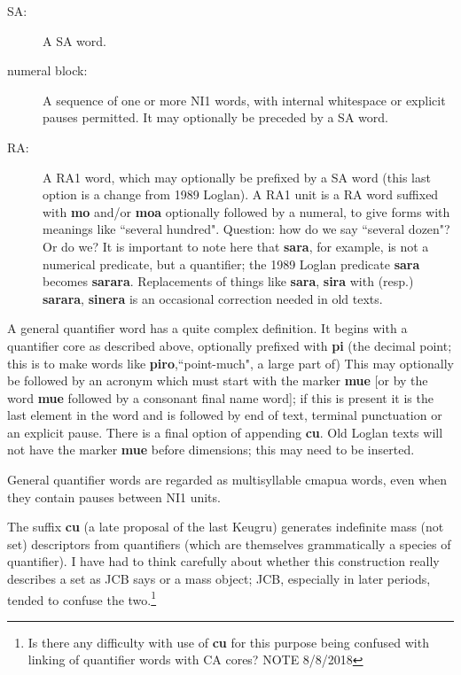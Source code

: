 \documentclass[12pt]{book}
\begin{document}
\begin{description}

\item[SA:]  A SA word.

\item[numeral block:]  A sequence of one or more NI1 words, with internal whitespace or explicit pauses permitted.  It may optionally be preceded by a SA word.

\item[RA:]  A RA1 word, which may optionally be prefixed by a SA word (this last option is a change from 1989 Loglan).  A RA1 unit is a RA word suffixed
with {\bf mo} and/or {\bf moa} optionally followed by a numeral, to give forms with meanings like ``several hundred".    Question:  how do we say ``several dozen"?  Or do we?  It is important to note here that {\bf sara}, for example, is not a numerical predicate, but a quantifier;  the 1989 Loglan predicate {\bf sara} becomes {\bf sarara}.  Replacements of things like {\bf sara}, {\bf sira} with (resp.) {\bf sarara}, {\bf sinera} is an occasional correction needed in old texts.

\end{description}

A general quantifier word has a quite complex definition.   It begins with a quantifier core as described above, optionally prefixed with {\bf pi} (the decimal point;  this is to make words like {\bf piro},``point-much",  a large part of)  This may optionally be followed by an acronym which must start with the marker {\bf mue} [or by the word {\bf mue} followed by a consonant final name word]; if this is present it is the last element in the word and is followed by end of text, terminal punctuation or an explicit pause.  There is a final option of appending {\bf cu}.   Old Loglan texts will not have the marker {\bf mue} before dimensions;  this may need to be inserted.

General quantifier words are regarded as multisyllable cmapua words, even when they contain pauses between NI1 units.

The suffix {\bf cu} (a late proposal of the last Keugru) generates indefinite mass  (not set) descriptors from quantifiers
(which are themselves grammatically a species of quantifier).  I have had to think carefully about whether this construction really describes a set as JCB says or a mass object; JCB, especially in later periods, tended to confuse the two.\footnote{Is there any difficulty with use of {\bf cu} for this purpose being confused with linking of quantifier words with CA cores?  NOTE 8/8/2018}
\end{document}
